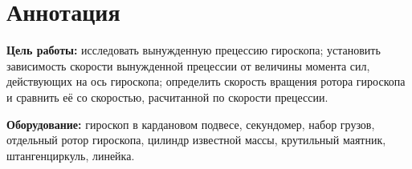 \section{Аннотация}
\textbf{Цель работы:} исследовать вынужденную прецессию гироскопа; установить
зависимость скорости вынужденной прецессии от величины момента сил, действующих
на ось гироскопа; определить скорость вращения ротора гироскопа и сравнить её
со скоростью, расчитанной по скорости прецессии.

\textbf{Оборудование:} гироскоп в кардановом подвесе, секундомер, набор грузов,
отдельный ротор гироскопа, цилиндр известной массы, крутильный маятник,
штангенциркуль, линейка.
